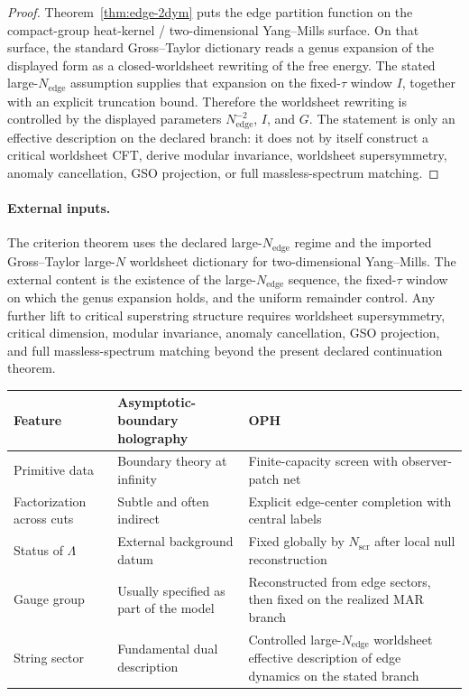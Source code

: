 \documentclass[11pt]{article}
\begin{document}
\begin{proof}
Theorem~\ref{thm:edge-2dym} puts the edge partition function on the compact-group heat-kernel /
two-dimensional Yang--Mills surface. On that surface, the standard Gross--Taylor dictionary reads
a genus expansion of the displayed form as a closed-worldsheet rewriting of the free energy. The
stated large-\(N_{\mathrm{edge}}\) assumption supplies that expansion on the fixed-\(\tau\) window
\(I\), together with an explicit truncation bound. Therefore the worldsheet rewriting is
controlled by the displayed parameters \(N_{\mathrm{edge}}^{-2}\), \(I\), and \(G\). The
statement is only an effective description on the declared branch: it does not by itself construct
a critical worldsheet CFT, derive modular invariance, worldsheet supersymmetry, anomaly
cancellation, GSO projection, or full massless-spectrum matching.
\end{proof}

\paragraph{External inputs.}
The criterion theorem uses the declared large-\(N_{\mathrm{edge}}\) regime and the imported
Gross--Taylor large-\(N\) worldsheet dictionary for two-dimensional Yang--Mills. The external
content is the existence of the large-\(N_{\mathrm{edge}}\) sequence, the fixed-\(\tau\) window on
which the genus expansion holds, and the uniform remainder control. Any further lift to critical
superstring structure requires worldsheet supersymmetry, critical dimension, modular invariance,
anomaly cancellation, GSO projection, and full massless-spectrum matching beyond the present
declared continuation theorem.

\begingroup
\footnotesize
\begin{tabular}{@{}>{\raggedright\arraybackslash}p{}>{\raggedright\arraybackslash}p{}>{\raggedright\arraybackslash}p{}@{}}
\toprule
Feature & Asymptotic-boundary holography & OPH \\
\midrule
Primitive data & Boundary theory at infinity & Finite-capacity screen with observer-patch net \\
Factorization across cuts & Subtle and often indirect & Explicit edge-center completion with central labels \\
Status of $\Lambda$ & External background datum & Fixed globally by $N_{\mathrm{scr}}$ after local null reconstruction \\
Gauge group & Usually specified as part of the model & Reconstructed from edge sectors, then fixed on the realized MAR branch \\
String sector & Fundamental dual description & Controlled large-$N_{\mathrm{edge}}$ worldsheet effective description of edge dynamics on the stated branch \\
\bottomrule
\end{tabular}
\endgroup
\end{document}
